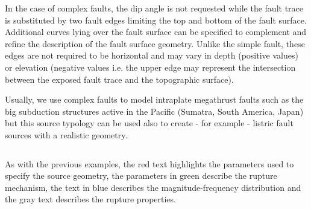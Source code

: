 In the case of complex faults, the dip angle is not requested while the fault
trace is substituted by two fault edges limiting the top and bottom of the fault
surface. Additional curves lying over the fault surface can be specified to
complement and refine the description of the fault surface geometry.
Unlike the simple fault, these edges are not required to be horizontal
and may vary in depth (positive values) or elevation (negative values i.e.
the upper edge may represent the intersection between the exposed fault trace
and the topographic surface).

Usually, we use complex faults to model intraplate megathrust faults such as
the big subduction structures active in the Pacific (Sumatra, South America,
Japan) but this source typology can be used also to create - for example -
listric fault sources with a realistic geometry.

\inputminted[firstline=1,firstnumber=1,fontsize=\footnotesize,frame=single,linenos,bgcolor=lightgray]{xml}{oqum/hazard/verbatim/input_complex_fault.xml}

%

As with the previous examples, the red text highlights the parameters used to
specify the source geometry, the parameters in green describe the rupture
mechanism, the text in blue describes the magnitude-frequency distribution and
the gray text describes the rupture properties.
